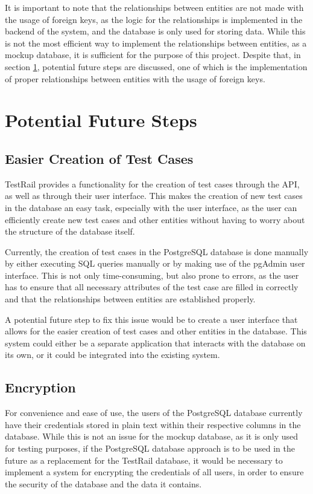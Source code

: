 It is important to note that the relationships between entities are not made with the usage of foreign keys, as the logic for the relationships is implemented in the backend of the system, and the database is only used for storing data. While this is not the most efficient way to implement the relationships between entities, as a mockup database, it is sufficient for the purpose of this project. Despite that, in section \ref{sec:potential-future-steps}, potential future steps are discussed, one of which is the implementation of proper relationships between entities with the usage of foreign keys.

\section{Potential Future Steps} \label{sec:potential-future-steps}

\subsection{Easier Creation of Test Cases}

TestRail provides a functionality for the creation of test cases through the API, as well as through their user interface. This makes the creation of new test cases in the database an easy task, especially with the user interface, as the user can efficiently create new test cases and other entities without having to worry about the structure of the database itself.

Currently, the creation of test cases in the PostgreSQL database is done manually by either executing SQL queries manually or by making use of the pgAdmin user interface. This is not only time-consuming, but also prone to errors, as the user has to ensure that all necessary attributes of the test case are filled in correctly and that the relationships between entities are established properly.

A potential future step to fix this issue would be to create a user interface that allows for the easier creation of test cases and other entities in the database. This system could either be a separate application that interacts with the database on its own, or it could be integrated into the existing system. 

\subsection{Encryption}

For convenience and ease of use, the users of the PostgreSQL database currently have their credentials stored in plain text within their respective columns in the database. While this is not an issue for the mockup database, as it is only used for testing purposes, if the PostgreSQL database approach is to be used in the future as a replacement for the TestRail database, it would be necessary to implement a system for encrypting the credentials of all users, in order to ensure the security of the database and the data it contains. 

